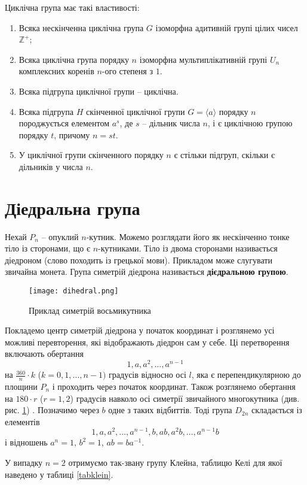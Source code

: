 Циклічна група має такі властивості:
\begin{enumerate}[noitemsep,partopsep=0pt,topsep=0pt,parsep=0pt]
\item Всяка нескінченна циклічна група $G$ ізоморфна адитивній групі цілих чисел $\mathbb{Z}^+$;
\item Всяка циклічна група порядку $n$ ізоморфна мультиплікативній групі $U_n$ комплексних коренів $n$-ого степеня з $1$. 
\item Всяка підгрупа циклічної групи -- циклічна.
\item Всяка підгрупа $H$ скінченної циклічної групи $G=\langle a \rangle$ порядку $n$ породжується елементом $a^s$, де $s$ -- дільник числа $n$, і є циклічною групою порядку $t$, причому $n = st$.
\item У циклічної групи скінченного порядку $n$ є стільки підгруп, скільки є дільників у числа $n$.
\end{enumerate}




\section{Діедральна група}\label{section.1.2}
Нехай $P_n$ -- опуклий $n$-кутник. Можемо розглядати його як нескінченно тонке тіло із сторонами, що є $n$-кутниками. Тіло із двома сторонами називається діедроном (слово походить із грецької мови). Прикладом може слугувати звичайна монета. Група симетрій діедрона називається \textbf{дієдральною групою}.

\begin{figure}[h!]
  \texttt{[image: dihedral.png]}
  \caption{Приклад симетрій восьмикутника}
  \label{fig:dih}
\end{figure}

Покладемо центр симетрій діедрона у початок координат і розглянемо усі можливі перевторення, які відображають діедрон сам у себе. Ці перетворення включають обертання
\[
1, a, a^2, \ldots, a^{n-1}
\]
на $\tfrac{360}{n} \cdot k$ ($k=0,1,\ldots,n-1)$ градусів відносно осі $l$, яка є перепендикулярною до площини $P_n$ і проходить через початок координат. Також розглянемо обертання на $180 \cdot r$ ($r=1,2$) градусів навколо осі симетрії звичайного многокутника (див. рис. \ref{fig:dih}) . Позначимо через $b$ одне з таких відбиттів. Тоді група $D_{2n}$ складається із елементів
\[
1,a,a^2,\ldots,a^{n-1},b,ab,a^2 b, \ldots, a^{n-1} b
\] 
і відношень $a^n = 1$, $b^2 = 1$, $a b = b a^{-1}$.

У випадку $n=2$ отримуємо так-звану групу Клейна, таблицю Келі для якої наведено у таблиці \ref{tabklein}.

